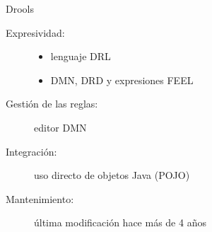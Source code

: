 \documentclass[10pt]{beamer}
\begin{document}
\begin{frame}{Drools}
    \begin{description}
        \item [Expresividad:] 
            \begin{itemize}
                \item lenguaje DRL
                \item DMN, DRD y expresiones FEEL
            \end{itemize}
        \item [Gestión de las reglas:]
            editor DMN
        \item [Integración:] uso directo de objetos Java (POJO)
        \item [Mantenimiento:] última modificación hace más de 4 años
    \end{description}
\end{frame}
\begin{comment}
Las reglas en Drools se pueden escribir utilizando DRL el lenguaje de reglas de Drools, o DMN la notación de diagramas de decisión, la cual utiliza DRD, que son diagramas de requerimientos de decisión. Estos diagramas estos compuestos por entradas y decisiones, estas últimas, a su vez, están formadas por expresiones que utilizan el lenguaje FEEL o lenguaje de expresión sufientemente amigable.

En este trabajo se favora la opción de utilizar DMN, ya que se espera que la representación visual de reglas permita su compresión por parte del personal de la obra social. Esta herramienta se encuentra disponible como una librería web autocontenida, o una extensión del visual studio code.

Más allá del lenguaje que se utilice para la expresión de las reglas, realizar cambios en las mismas no requiere la recompilación del código de la aplicación.

Para la gestión de las reglas, Drools cuenta con DMN editor, herramienta con la cual se puede crear, modificar y eliminar reglas.

Las reglas pueden hacer uso de objetos POJO, es decir objetos únicamente con getters y setters.

Drools continúa en desarrollo, siendo la publicación de la última versión estable el año pasado y la última modificación del repositorio la semana pasada.
\end{comment}
\end{document}
